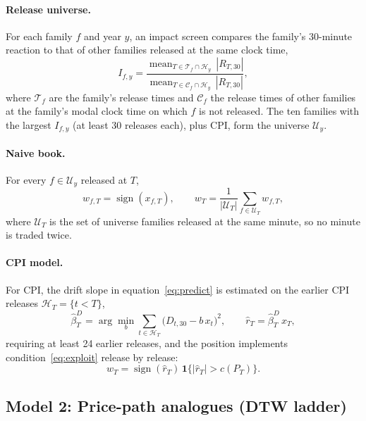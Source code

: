 \paragraph{Release universe.} For each family $f$ and year $y$, an impact screen compares the
family's 30-minute reaction to that of other families released at the same clock time,
\begin{equation}\label{eq:impact}
  I_{f,y} = \frac{\operatorname{mean}_{T\in\mathcal{T}_{f}\cap\mathcal{H}_y}\,|R_{T,30}|}
  {\operatorname{mean}_{T\in\mathcal{C}_{f}\cap\mathcal{H}_y}\,|R_{T,30}|},
\end{equation}
where $\mathcal{T}_f$ are the family's release times and $\mathcal{C}_f$ the release times of other
families at the family's modal clock time on which $f$ is not released. The ten families with the
largest $I_{f,y}$ (at least 30 releases each), plus CPI, form the universe $\mathcal{U}_y$.

\paragraph{Naive book.} For every $f\in\mathcal{U}_y$ released at $T$,
\begin{equation}\label{eq:naive}
  w_{f,T} = \operatorname{sign}\left(x_{f,T}\right),\qquad
  w_T = \frac{1}{|\mathcal{U}_T|}\sum_{f\in\mathcal{U}_T} w_{f,T},
\end{equation}
where $\mathcal{U}_T$ is the set of universe families released at the same minute, so no minute is
traded twice.

\paragraph{CPI model.} For CPI, the drift slope in equation~\eqref{eq:predict} is estimated on
the earlier CPI releases $\mathcal{H}_T=\{t<T\}$,
\begin{equation}\label{eq:cpimodel}
  \hat\beta^{D}_{T} = \arg\min_{b}\sum_{t\in\mathcal{H}_T}\big(D_{t,30}-b\,x_{t}\big)^2,
  \qquad \hat r_T=\hat\beta^{D}_{T}\,x_T,
\end{equation}
requiring at least 24 earlier releases, and the position implements
condition~\eqref{eq:exploit} release by release:
\begin{equation}\label{eq:cpitrade}
  w_T = \operatorname{sign}(\hat r_T)\,\mathbf{1}\big\{|\hat r_T| > c(P_{T})\big\}.
\end{equation}

\subsection{Model 2: Price-path analogues (DTW ladder)}\label{sec:model_dtw}

